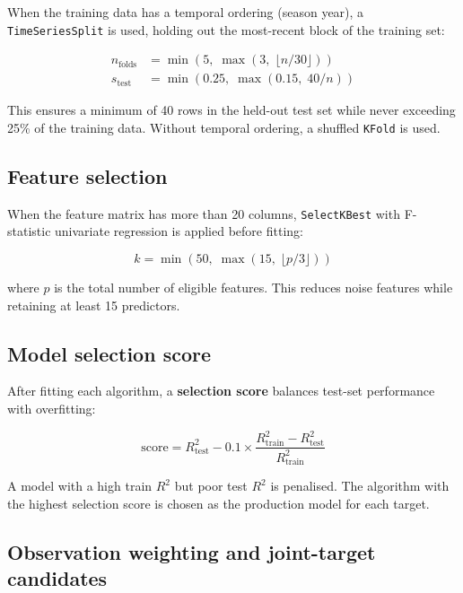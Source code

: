 \documentclass[11pt, a4paper]{article}
\begin{document}
When the training data has a temporal ordering (season year), a \texttt{TimeSeriesSplit} is
used, holding out the most-recent block of the training set:

\begin{align}
  n_{\text{folds}} &= \min\!\left(5,\; \max\!\left(3,\; \lfloor n / 30 \rfloor\right)\right) \\
  s_{\text{test}} &= \min\!\left(0.25,\; \max\!\left(0.15,\; 40 / n\right)\right)
\end{align}

This ensures a minimum of 40 rows in the held-out test set while never exceeding 25\% of the
training data. Without temporal ordering, a shuffled \texttt{KFold} is used.

\subsection{Feature selection}

When the feature matrix has more than 20 columns, \texttt{SelectKBest} with F-statistic
univariate regression is applied before fitting:

\begin{equation}
  k = \min\!\left(50,\; \max\!\left(15,\; \lfloor p / 3 \rfloor\right)\right)
\end{equation}

where $p$ is the total number of eligible features. This reduces noise features while retaining
at least 15 predictors.

\subsection{Model selection score}

After fitting each algorithm, a \textbf{selection score} balances test-set performance with
overfitting:

\begin{equation}
  \text{score} = R^2_{\text{test}} - 0.1 \times \frac{R^2_{\text{train}} - R^2_{\text{test}}}{R^2_{\text{train}}}
  \label{eq:selection_score}
\end{equation}

A model with a high train $R^2$ but poor test $R^2$ is penalised. The algorithm with the
highest selection score is chosen as the production model for each target.

\subsection{Observation weighting and joint-target candidates}
\label{sec:weighting}
\end{document}
